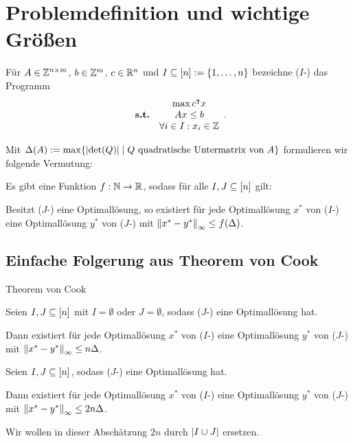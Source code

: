 \section{Problemdefinition und wichtige Größen}

\begin{frame}
	\begin{definition}
		Für $A\in\mathbb{Z}^{n\times m}$, $b\in\mathbb{Z}^m$, $c\in\mathbb{R}^n$ und $I\subseteq[n]:=\{1,\dots,n\}$ bezeichne ($I$-\MIPI) das Programm
		$$\begin{array}{lc}
		&\max c^\intercal x \\
		\textbf{s.t.} &Ax\leq b\\
		&\forall i\in I: x_i\in\mathbb{Z}
		\end{array}.$$
	\end{definition}

	\pause
	Mit $\Delta(A):=\max\{\lvert  \det(Q) \rvert \mid Q \text{ quadratische Untermatrix von } A \}$ formulieren wir folgende Vermutung:
	
	\pause
	\begin{conjecture}
		Es gibt eine Funktion $f: \mathbb{N}\rightarrow\mathbb{R}$, sodass für alle $I,J\subseteq[n]$ gilt:
		
		Besitzt ($J$-\MIPI) eine Optimallösung, so existiert für jede Optimallösung $x^*$ von ($I$-\MIPI) eine Optimallösung $y^*$ von ($J$-\MIPI) mit $\left\lVert x^* - y^*\right\rVert_\infty\leq f(\Delta)$.
	\end{conjecture}
\end{frame}

\subsection{Einfache Folgerung aus Theorem von Cook}
\begin{frame}{Theorem von Cook}
\begin{theorem}[Cook u. a., 1986]\label{thm:cook}
	Seien $I, J\subseteq[n]$ mit $I=\emptyset$ oder $J=\emptyset$, sodass ($J$-\MIPI) eine Optimallösung hat.
	
	Dann existiert für jede Optimallösung $x^*$ von ($I$-\MIPI) eine Optimallösung $y^*$ von ($J$-\MIPI) mit $\left\lVert x^*-y^*\right\rVert_\infty\leq n\Delta$.
\end{theorem}
\pause
\begin{korollar}
	Seien $I,J\subseteq[n]$, sodass ($J$-\MIPI) eine Optimallösung hat.
	
	Dann existiert für jede Optimallösung $x^*$ von ($I$-\MIPI) eine Optimallösung $y^*$ von ($J$-\MIPI) mit $\left\lVert x^*-y^*\right\rVert_\infty\leq2 n\Delta$.
\end{korollar}
\pause
Wir wollen in dieser Abschätzung $2n$ durch $\lvert I\cup J \rvert$ ersetzen.
\end{frame}

